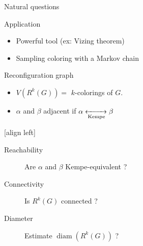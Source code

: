 \documentclass[11pt,xcolor=dvipsnames,presentation]{beamer}
\DeclareMathOperator{\diam}{diam}
\begin{document}
\begin{frame}{Natural questions}
  \begin{block}{Application}
    \begin{itemize}
    \item Powerful tool (ex: Vizing theorem)
    \item Sampling coloring with a Markov chain
    \end{itemize}
  \end{block}

  \begin{exampleblock}{Reconfiguration graph}
    \begin{itemize}
    \item $V(R^k(G)) =$ $k$-colorings of $G$.
    \item $\alpha$ and $\beta$ adjacent  if $\alpha
      \xleftrightarrow[\text{Kempe}]{} \beta$
    \end{itemize}
  \end{exampleblock}

  [align left] 
  \begin{description}
  \item[Reachability] Are $\alpha$ and $\beta$ Kempe-equivalent ? 
  \item[Connectivity] Is $R^k(G)$ connected ?
  \item[Diameter] Estimate $\diam(R^k(G))$ ?
  \end{description}
\end{frame}
\end{document}
